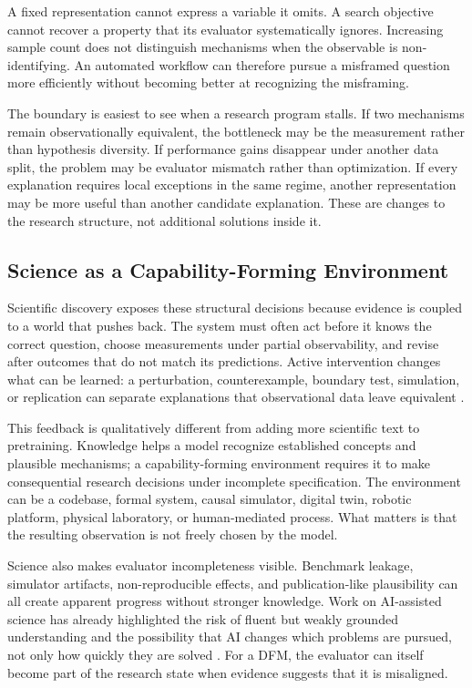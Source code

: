 \documentclass[11pt, a4paper, copyright]{google}
\begin{document}
A fixed representation cannot express a variable it omits. A search objective cannot recover a property that its evaluator systematically ignores. Increasing sample count does not distinguish mechanisms when the observable is non-identifying. An automated workflow can therefore pursue a misframed question more efficiently without becoming better at recognizing the misframing.

The boundary is easiest to see when a research program stalls. If two mechanisms remain observationally equivalent, the bottleneck may be the measurement rather than hypothesis diversity. If performance gains disappear under another data split, the problem may be evaluator mismatch rather than optimization. If every explanation requires local exceptions in the same regime, another representation may be more useful than another candidate explanation. These are changes to the research structure, not additional solutions inside it.

\subsection{Science as a Capability-Forming Environment}
\label{subsec:science-as-catalyst}

Scientific discovery exposes these structural decisions because evidence is coupled to a world that pushes back. The system must often act before it knows the correct question, choose measurements under partial observability, and revise after outcomes that do not match its predictions. Active intervention changes what can be learned: a perturbation, counterexample, boundary test, simulation, or replication can separate explanations that observational data leave equivalent \citep{chaloner1995bayesdesign,boiko2023coscientist,szymanski2023alab}.

This feedback is qualitatively different from adding more scientific text to pretraining. Knowledge helps a model recognize established concepts and plausible mechanisms; a capability-forming environment requires it to make consequential research decisions under incomplete specification. The environment can be a codebase, formal system, causal simulator, digital twin, robotic platform, physical laboratory, or human-mediated process. What matters is that the resulting observation is not freely chosen by the model.

Science also makes evaluator incompleteness visible. Benchmark leakage, simulator artifacts, non-reproducible effects, and publication-like plausibility can all create apparent progress without stronger knowledge. Work on AI-assisted science has already highlighted the risk of fluent but weakly grounded understanding and the possibility that AI changes which problems are pursued, not only how quickly they are solved \citep{messeri2024illusions,hao2026impact}. For a DFM, the evaluator can itself become part of the research state when evidence suggests that it is misaligned.
\end{document}
